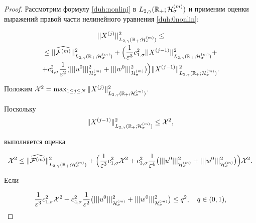 \begin{proof} Рассмотрим формулу \eqref{duh:nonlinj} в $L_{2,\gamma}(\mathbb R_{+};{\cal H}^{(m)}_{\sigma})$ и применим оценки выражений правой части нелинейного уравнения  \eqref{duh:0nonlin}:

\begin{multline*}

||X^{(j)}||^2_{L_{2,\gamma}(\mathbb R_{+};{\cal H}^{(m)}_{\sigma})}\le 

\\

\le|| \widehat{{\cal F}^{(m)}} ||^2_{L_{2,\gamma}(\mathbb R_{+};{\cal H}^{(m)}_{\sigma})}+\Bigl(\frac{1}{\varepsilon^3}c^2_{1,\sigma}||X^{(j-1)}||^2_{L_{2,\gamma}(\mathbb R_{+};{\cal H}^{(m)}_{\sigma})}+

\\

+c^2_{4,\sigma}\frac{1}{\varepsilon^2}(|||u^0|||^2_{{\cal H}^{(m)}_\sigma}+|||w^0|||^2_{{\cal H}^{(m)}_\sigma})\Bigr) \|X^{(j-1)} \|^2_{L_{2,\gamma}(\mathbb R_{+};{\cal H}^{(m)}_{\sigma})}.

\end{multline*}

Положим ${\cal X}^2=\max_{1\le j\le N} \|X^{(j)}\|^2_{L_{2,\gamma}(\mathbb R_{+};{\cal H}^{(m)}_\sigma)}$.

Поскольку $$\|X^{(j-1)}\|^2_{L_{2,\gamma}(\mathbb R_{+};{\cal H}^{(m)}_\sigma)}\le {\cal X}^2,$$ 

выполняется оценка

$$

{\cal X}^2\le \| \widehat{{\cal F}^{(m)}} \|^2_{L_{2,\gamma}(\mathbb R_{+};{\cal H}^{(m)}_{\sigma})}+

\Bigl(\frac{1}{\varepsilon^3}c^2_{1,\sigma}{\cal X}^2+

c^2_{3,\sigma}\frac{1}{\varepsilon^4} 

\bigl(|||u^0|||^2_{{\cal H}^{(m)}_\sigma}+|||w^0|||^2_{{\cal H}^{(m)}_\sigma} \bigr)\Bigr){\cal X}^2.

$$

Если

\begin{equation}

\frac{1}{\varepsilon^3}c^2_{1,\sigma}{\cal X}^2

+c^2_{4,\sigma}\frac{1}{\varepsilon^2}

\bigl(|||u^0|||^2_{{\cal H}^{(m)}_\sigma}+|||w^0|||^2_{{\cal H}^{(m)}_\sigma}\bigr)\le q^2 ,\quad  q\in (0, 1),

\label{duh:conest}


\end{equation}
\end{proof}
